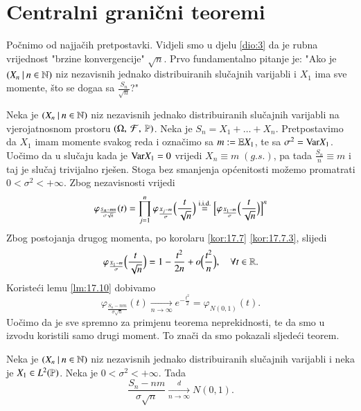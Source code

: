 
\chapter{Centralni grani\v cni teoremi}

Po\v cnimo od najja\v cih pretpostavki.
Vidjeli smo u djelu \ref{dio:3} da je rubna vrijednost "brzine konvergencije" $\sqrt{n}$.
Prvo fundamentalno pitanje je: "Ako je $({X_n} \: | \: {n \in \mathbb{N}})$ niz nezavisnih jednako distribuiranih slu\v cajnih varijabli i $X_1$ ima sve momente, \v sto se doga\dj a sa $\frac{S_n}{\sqrt{n}}$?"

Neka je $({X_n} \: | \: {n \in \mathbb{N}})$ niz nezavisnih jednako distribuiranih slu\v cajnih varijabli na vjerojatnosnom prostoru $(\Omega, \: \mathcal{F}, \: \mathbb{P})$.
Neka je $S_n = X_1 + \ldots + X_n$.
Pretpostavimo da $X_1$ imam momente svakog reda i ozna\v cimo sa $m:= \mathbb{E} X_1$, te sa $\sigma^2 = \mathrm{Var} X_1$.
Uo\v cimo da u slu\v caju kada je $\mathrm{Var} X_1 = 0$ vrijedi $X_n \equiv m \; (g.s.)$, pa tada $\frac{S_n}{n} \equiv m$ i taj je slu\v caj trivijalno rje\v sen.
Stoga bez smanjenja op\' cenitosti mo\v zemo promatrati $0 < \sigma^2 < +\infty$.
Zbog nezavisnosti vrijedi
\begin{equation*}
    \varphi_{\frac{S_n - m n}{\sigma \sqrt{n}}} (t) = \prod\limits_{j = 1}^{n} \varphi_{\frac{X_j - m}{\sigma}} \Big( \frac{t}{\sqrt{n}} \Big) \overset{\mathrm{i.i.d.}}{=} \Big[ \varphi_{\frac{X_1 - m}{\sigma}} \Big( \frac{t}{\sqrt{n}} \Big) \Big]^n
\end{equation*}
Zbog postojanja drugog momenta, po korolaru \ref{kor:17.7} \ref{kor:17.7.3}, slijedi
\begin{equation*}
    \varphi_{\frac{X_1 - m}{\sigma}} \Big( \frac{t}{\sqrt{n}} \Big) = 1 - \frac{t^2}{2 n} + o \Big( \frac{t^2}{n} \Big), \quad \forall t \in \mathbb{R}.
\end{equation*}
Koriste\' ci lemu \ref{lm:17.10} dobivamo
\begin{equation*}
    \varphi_{\frac{S_n - n m}{\sigma \sqrt{n}}} (t) \xrightarrow[n \to \infty]{} e^{-\frac{t^2}{2}} = \varphi_{N(0,1)} (t).
\end{equation*}
Uo\v cimo da je sve spremno za primjenu teorema neprekidnosti, te da smo u izvodu koristili samo drugi moment.
To zna\v ci da smo pokazali sljede\' ci teorem.

\begin{tm}  \label{tm:19.1}
    \quad \newline
    Neka je $({X_n} \: | \: {n \in \mathbb{N}})$ niz nezavisnih jednako distribuiranih slu\v cajnih varijabli i neka je $X_1 \in L^2 (\mathbb{P})$.
    Neka je $0 < \sigma^2 < +\infty$.
    Tada
    \begin{equation*}
        \frac{S_n - n m}{\sigma \sqrt{n}} \xrightarrow[n \to \infty]{d} N (0, 1).
    \end{equation*}    
\end{tm}

